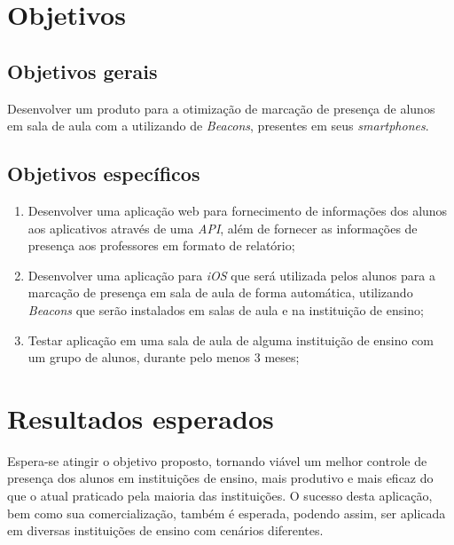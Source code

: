 \documentclass[
	12pt,
	oneside,
	a4paper,
	english,
	brazil,
]{abntex2}
\begin{document}
\chapter{Objetivos}

\section{Objetivos gerais}
Desenvolver um produto para a otimização de marcação de presença de alunos em sala de aula com a utilizando de \emph{Beacons}, presentes em seus \emph{smartphones}.

\section{Objetivos específicos}
\begin{enumerate}
  \item Desenvolver uma aplicação web para fornecimento de informações dos alunos aos aplicativos através de uma \emph{API}, além de fornecer as informações de presença aos professores em formato de relatório;
  \item Desenvolver uma aplicação para \emph{iOS} que será utilizada pelos alunos para a marcação de presença em sala de aula de forma automática, utilizando \emph{Beacons} que serão instalados em salas de aula e na instituição de ensino;
  \item Testar aplicação em uma sala de aula de alguma instituição de ensino com um grupo de alunos, durante pelo menos 3 meses;
\end{enumerate}


\chapter{Resultados esperados}

Espera-se atingir o objetivo proposto, tornando viável um melhor controle de presença dos alunos em instituições de ensino, mais produtivo e mais eficaz do que o atual praticado pela maioria das instituições.
O sucesso desta aplicação, bem como sua comercialização, também é esperada, podendo assim, ser aplicada em diversas instituições de ensino com cenários diferentes.


\end{document}
